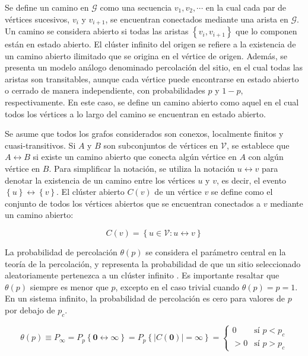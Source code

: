 Se define un camino en $\mathcal{G}$ como una secuencia $v_1, v_2, \cdots$ en la cual cada par de vértices sucesivos, $v_i$ y $v_{i +1}$, se encuentran conectados mediante una arista en $\mathcal{G}$. Un camino se considera abierto si todas las aristas $\left\{v_i,v_{i+1}\right\}$ que lo componen están en estado abierto. El clúster infinito del origen se refiere a la existencia de un camino abierto ilimitado que se origina en el vértice de origen. Además, se presenta un modelo análogo denominado percolación del sitio, en el cual todas las aristas son transitables, aunque cada vértice puede encontrarse en estado abierto o cerrado de manera independiente, con probabilidades $p$ y $1 - p$, respectivamente. En este caso, se define un camino abierto como aquel en el cual todos los vértices a lo largo del camino se encuentran en estado abierto.

 Se asume que todos los grafos considerados son conexos, localmente finitos y cuasi-transitivos. Si $A$ y $B$ son subconjuntos de vértices en $\mathcal{V}$, se establece que $A\leftrightarrow B$ si existe un camino abierto que conecta algún vértice en $A$ con algún vértice en $B$. Para simplificar la notación, se utiliza la notación $u \leftrightarrow v$ para denotar la existencia de un camino entre los vértices $u$ y $v$, es decir, el evento $\left\{u\right\} \leftrightarrow \left\{v\right\}$. El clúster abierto $C(v)$  de un vértice $v$ se define como el conjunto de todos los vértices abiertos que se encuentran conectados a $v$ mediante un camino abierto:

\begin{equation}\label{eq:1}
	C(v) = \left\{u\in \mathcal{V}: u \leftrightarrow v \right\}
\end{equation}

La probabilidad de percolación $\theta(p)$  se considera el parámetro central en la teoría de la percolación, y representa la probabilidad de que un sitio seleccionado aleatoriamente pertenezca a un clúster infinito \cite{torquato_percolation_2002}. Es importante resaltar que $\theta(p)$  siempre es menor que $p$, excepto en el caso trivial cuando $\theta(p) = p = 1$. En un sistema infinito, la probabilidad de percolación es cero para valores de $p$ por debajo de $p_c$.


\begin{equation}\label{eq:2}
\theta(p)  \equiv P_\infty = P_p\left\{\mathbf{0} \leftrightarrow \infty\right\} = P_p\left\{\left| C(\mathbf{0})\right|=\infty \right\}  = \begin{cases}
	0 & \text{sí } p<p_c\\
	>0 & \text{sí } p>p_c
\end{cases}
\end{equation}


